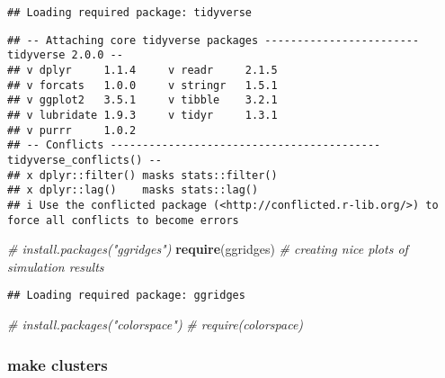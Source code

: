 \documentclass[
]{article}
\newenvironment{Shaded}{\begin{snugshade}}{\end{snugshade}}
\newcommand{\CommentTok}[1]{\textcolor[rgb]{0.56,0.35,0.01}{\textit{#1}}}
\newcommand{\FunctionTok}[1]{\textcolor[rgb]{0.13,0.29,0.53}{\textbf{#1}}}
\newcommand{\NormalTok}[1]{#1}
\begin{document}
\begin{verbatim}
## Loading required package: tidyverse
\end{verbatim}

\begin{verbatim}
## -- Attaching core tidyverse packages ------------------------ tidyverse 2.0.0 --
## v dplyr     1.1.4     v readr     2.1.5
## v forcats   1.0.0     v stringr   1.5.1
## v ggplot2   3.5.1     v tibble    3.2.1
## v lubridate 1.9.3     v tidyr     1.3.1
## v purrr     1.0.2     
## -- Conflicts ------------------------------------------ tidyverse_conflicts() --
## x dplyr::filter() masks stats::filter()
## x dplyr::lag()    masks stats::lag()
## i Use the conflicted package (<http://conflicted.r-lib.org/>) to force all conflicts to become errors
\end{verbatim}

\begin{Shaded}
\begin{Highlighting}[]
\CommentTok{\# install.packages("ggridges")}
\FunctionTok{require}\NormalTok{(ggridges) }\CommentTok{\# creating nice plots of simulation results}
\end{Highlighting}
\end{Shaded}

\begin{verbatim}
## Loading required package: ggridges
\end{verbatim}

\begin{Shaded}
\begin{Highlighting}[]
\CommentTok{\# install.packages("colorspace")}
\CommentTok{\# require(colorspace)}
\end{Highlighting}
\end{Shaded}

\subsubsection{make clusters}\label{make-clusters}
\end{document}
